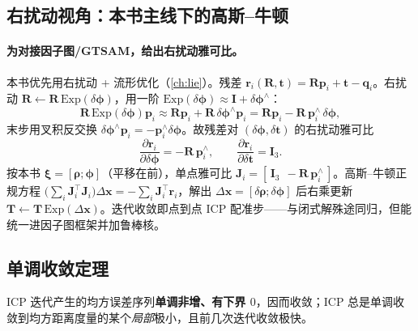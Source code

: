 \subsection{右扰动视角：本书主线下的高斯--牛顿}
\label{sec:pc-icp-rightpert}

\paragraph{为对接因子图/GTSAM，给出右扰动雅可比。}
本书优先用右扰动 + 流形优化（\cref{ch:lie}）。残差 $\mathbf{r}_i(\mathbf{R},\mathbf{t})=\mathbf{R}\mathbf{p}_i+\mathbf{t}-\mathbf{q}_i$。右扰动 $\mathbf{R}\leftarrow\mathbf{R}\,\mathrm{Exp}(\delta\boldsymbol{\phi})$，用一阶 $\mathrm{Exp}(\delta\boldsymbol{\phi})\approx\mathbf{I}+\delta\boldsymbol{\phi}^\wedge$：
\begin{equation}
  \mathbf{R}\,\mathrm{Exp}(\delta\boldsymbol{\phi})\mathbf{p}_i\approx\mathbf{R}\mathbf{p}_i+\mathbf{R}\,\delta\boldsymbol{\phi}^\wedge\mathbf{p}_i
  =\mathbf{R}\mathbf{p}_i-\mathbf{R}\,\mathbf{p}_i^\wedge\,\delta\boldsymbol{\phi},
\end{equation}
末步用叉积反交换 $\delta\boldsymbol{\phi}^\wedge\mathbf{p}_i=-\mathbf{p}_i^\wedge\delta\boldsymbol{\phi}$。故残差对 $(\delta\boldsymbol{\phi},\delta\mathbf{t})$ 的右扰动雅可比
\begin{equation}
  \frac{\partial\mathbf{r}_i}{\partial\delta\boldsymbol{\phi}}=-\mathbf{R}\,\mathbf{p}_i^\wedge,\qquad
  \frac{\partial\mathbf{r}_i}{\partial\delta\mathbf{t}}=\mathbf{I}_3.
  \label{eq:pc-icp-jac}
\end{equation}
按本书 $\boldsymbol{\xi}=[\boldsymbol{\rho};\boldsymbol{\phi}]$（平移在前），单点雅可比 $\mathbf{J}_i=[\,\mathbf{I}_3\ \ -\mathbf{R}\,\mathbf{p}_i^\wedge\,]$。高斯--牛顿正规方程 $\big(\sum_i\mathbf{J}_i^\top\mathbf{J}_i\big)\Delta\mathbf{x}=-\sum_i\mathbf{J}_i^\top\mathbf{r}_i$，解出 $\Delta\mathbf{x}=[\delta\boldsymbol{\rho};\delta\boldsymbol{\phi}]$ 后右乘更新 $\mathbf{T}\leftarrow\mathbf{T}\,\mathrm{Exp}(\Delta\mathbf{x})$。迭代收敛即点到点 ICP 配准步——与闭式解殊途同归，但能统一进因子图框架并加鲁棒核。

\subsection{单调收敛定理}
\label{sec:pc-icp-convergence}

\begin{theorem}\label{thm:pc-convergence}
ICP 迭代产生的均方误差序列\textbf{单调非增、有下界 $0$}，因而收敛；ICP 总是单调收敛到均方距离度量的某个\emph{局部}极小，且前几次迭代收敛极快\cite{besl1992icp}。
\end{theorem}

